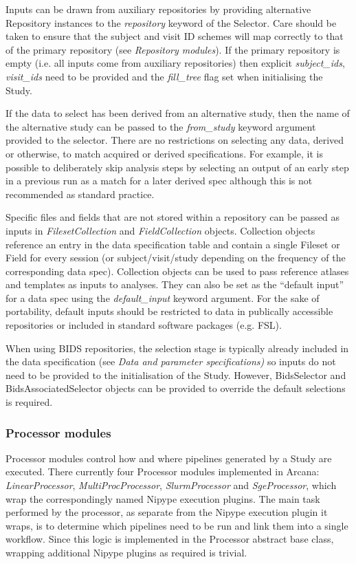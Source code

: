 Inputs can be drawn from auxiliary repositories by providing alternative
Repository instances to the \emph{repository} keyword of the Selector.
Care should be taken to ensure that the subject and visit ID schemes
will map correctly to that of the primary repository (see
\emph{Repository modules}). If the primary repository is empty (i.e. all
inputs come from auxiliary repositories) then explicit
\emph{subject\_ids}, \emph{visit\_ids} need to be provided and the
\emph{fill\_tree} flag set when initialising the Study.

If the data to select has been derived from an alternative study, then
the name of the alternative study can be passed to the
\emph{from\_study} keyword argument provided to the selector. There are
no restrictions on selecting any data, derived or otherwise, to match
acquired or derived specifications. For example, it is possible to
deliberately skip analysis steps by selecting an output of an early step
in a previous run as a match for a later derived spec although this is
not recommended as standard practice.

Specific files and fields that are not stored within a repository can be
passed as inputs in \emph{FilesetCollection} and \emph{FieldCollection}
objects. Collection objects reference an entry in the data specification
table and contain a single Fileset or Field for every session (or
subject/visit/study depending on the frequency of the corresponding data
spec). Collection objects can be used to pass reference atlases and
templates as inputs to analyses. They can also be set as the ``default
input'' for a data spec using the \emph{default\_input} keyword
argument. For the sake of portability, default inputs should be
restricted to data in publically accessible repositories or included in
standard software packages (e.g. FSL).

When using BIDS repositories, the selection stage is typically already
included in the data specification (see \emph{Data and parameter
specifications)} so inputs do not need to be provided to the
initialisation of the Study. However, BidsSelector and
BidsAssociatedSelector objects can be provided to override the default
selections is required.

\subsubsection{Processor modules}
\label{processor-modules}

Processor modules control how and where pipelines generated by a Study
are executed. There currently four Processor modules implemented in
Arcana: \emph{LinearProcessor}, \emph{MultiProcProcessor},
\emph{SlurmProcessor} and \emph{SgeProcessor}, which wrap the
correspondingly named Nipype execution plugins. The main task performed
by the processor, as separate from the Nipype execution plugin it wraps,
is to determine which pipelines need to be run and link them into a
single workflow. Since this logic is implemented in the Processor
abstract base class, wrapping additional Nipype plugins as required is
trivial.

